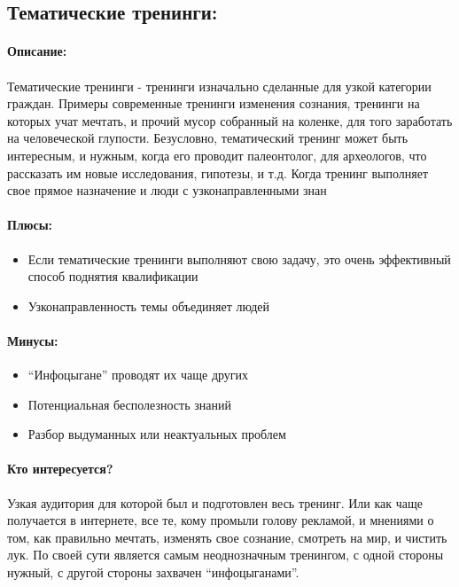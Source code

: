 \documentclass{article}
\begin{document}
\subsection{Тематические тренинги:}
\paragraph{\textbf{Описание:}}
\paragraph{}
Тематические тренинги - тренинги изначально сделанные для узкой категории граждан. Примеры современные тренинги изменения сознания, тренинги на которых учат мечтать, и прочий мусор собранный на коленке, для того заработать на человеческой глупости. Безусловно, тематический тренинг может быть интересным, и нужным, когда его проводит палеонтолог, для археологов, что рассказать им новые исследования, гипотезы, и т.д. Когда тренинг выполняет свое прямое назначение и люди с узконаправленными знан
\paragraph{\textbf{Плюсы:}}
\begin{itemize}
    \item Если тематические тренинги выполняют свою задачу, это очень эффективный способ поднятия квалификации
    \item Узконаправленность темы объединяет людей
\end{itemize}
\paragraph{\textbf{Минусы:}}
\begin{itemize}
    \item “Инфоцыгане” проводят их чаще других
    \item Потенциальная бесполезность знаний
    \item Разбор выдуманных или неактуальных проблем
\end{itemize}
\paragraph{\textbf{Кто интересуется?}}
Узкая аудитория для которой был и подготовлен весь тренинг. Или как чаще получается в интернете, все те, кому промыли голову рекламой, и мнениями о том, как правильно мечтать, изменять свое сознание, смотреть на мир, и чистить лук. По своей сути является самым неоднозначным тренингом, с одной стороны нужный, с другой стороны захвачен “инфоцыганами”.
\end{document}

